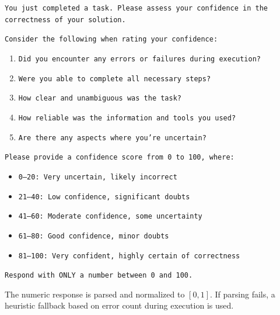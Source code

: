 \documentclass[11pt]{article}
\begin{document}
\vspace{0.5em}
\begin{tcolorbox}[
    colback=gray!5!white,
    colframe=gray!50!black,
    title={\textbf{TauBench Confidence Prompt}},
    fonttitle=\bfseries\small,
    boxrule=0.5pt,
    arc=2pt,
    left=4pt, right=4pt, top=4pt, bottom=4pt,
    breakable
]
\small
\texttt{You just completed a task. Please assess your confidence in the correctness of your solution.}

\texttt{Consider the following when rating your confidence:}
\begin{enumerate}[leftmargin=*, topsep=2pt, itemsep=1pt]
    \item \texttt{Did you encounter any errors or failures during execution?}
    \item \texttt{Were you able to complete all necessary steps?}
    \item \texttt{How clear and unambiguous was the task?}
    \item \texttt{How reliable was the information and tools you used?}
    \item \texttt{Are there any aspects where you're uncertain?}
\end{enumerate}

\texttt{Please provide a confidence score from 0 to 100, where:}
\begin{itemize}[leftmargin=*, topsep=2pt, itemsep=1pt]
    \item \texttt{0--20: Very uncertain, likely incorrect}
    \item \texttt{21--40: Low confidence, significant doubts}
    \item \texttt{41--60: Moderate confidence, some uncertainty}
    \item \texttt{61--80: Good confidence, minor doubts}
    \item \texttt{81--100: Very confident, highly certain of correctness}
\end{itemize}

\texttt{Respond with ONLY a number between 0 and 100.}
\end{tcolorbox}

The numeric response is parsed and normalized to $[0, 1]$. If parsing fails, a heuristic fallback based on error count during execution is used.
\end{document}

